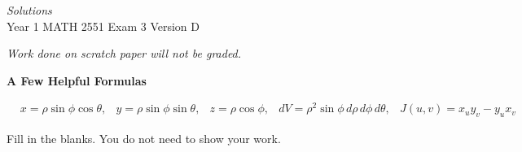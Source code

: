 \ifnum {} \renewcommand{\TestName}{Year 1 MATH 2551 Exam 3 Sample A} \fi
\ifnum {} \renewcommand{\TestName}{Year 1 MATH 2551 Exam 3 Sample B} \fi
\ifnum {} \renewcommand{\TestName}{Year 1 MATH 2551 Exam 3 Sample C} \fi
\ifnum {} \renewcommand{\TestName}{Year 1 MATH 2551 Exam 3 Sample D} \fi
\ifnum {} \renewcommand{\TestName}{Year 1 MATH 2551 Exam 3 Sample E} \fi
\ifnum {} \renewcommand{\TestName}{Year 1 MATH 2551 Exam 3 Version A} \fi
\ifnum {} \renewcommand{\TestName}{Year 1 MATH 2551 Exam 3 Version B} \fi
\ifnum {} \renewcommand{\TestName}{Year 1 MATH 2551 Exam 3 Version C} \fi
\ifnum {} \renewcommand{\TestName}{Year 1 MATH 2551 Exam 3 Version D} \fi



\begin{center}
\ifnum {} {\Large {\color{DarkBlue}\textit{Solutions}}\\[6pt]}\fi
{\Large \TestName}
\end{center}

\vspace{-16pt}

\begin{center}
\textit{Work done on scratch paper will not be graded.}

\vspace{8pt}
\textbf{A Few Helpful Formulas}
\vspace{8pt}

$
\begin{array}{llllll}
    & \displaystyle x = \rho \sin\phi \cos\theta,
    & \displaystyle y = \rho \sin\phi \sin\theta,
    & \displaystyle z = \rho \cos\phi,
    & \displaystyle dV = \rho^2 \sin \phi \, d\rho \, d\phi \, d\theta,
    & \displaystyle J(u,v) = x_uy_v - y_ux_v
\end{array} 
$
\end{center}
\begin{questions}
\question[0.5] \ID

\question[7] Fill in the blanks. You do not need to show your work. 
    
\begin{parts}
    
    
    
    
    
       
       
\end{parts}

\newpage \question[0.25] \ID


\newpage \question[0.25] \ID


\end{questions}